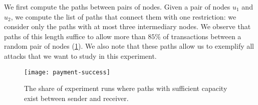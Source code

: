 We first compute the paths between pairs of nodes.
Given a pair of nodes $u_1$ and $u_2$, 
we compute the list of paths that connect them with one restriction:
we consider only the paths with at most three intermediary nodes.
We observe that paths of this length suffice to allow more than $85\%$ of 
transactions between a random pair of nodes (\cref{fig:payment-success}).
We also note that these paths allow us to exemplify all attacks that we want to study in this experiment.
\begin{figure}
	\centering
	\texttt{[image: payment-success]}
	\caption{The share of experiment runs where paths with sufficient capacity exist between sender and receiver.}
	\label{fig:payment-success}
\end{figure}



